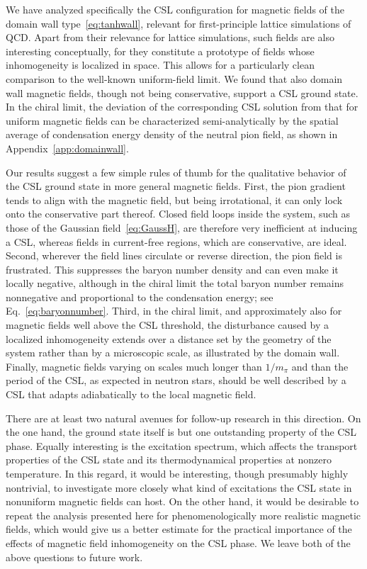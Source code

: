 \documentclass[pdflatex,iicol,sn-mathphys-num]{sn-jnl}
\begin{document}
We have analyzed specifically the CSL configuration for magnetic fields of the domain wall type~\eqref{eq:tanhwall}, relevant for first-principle lattice simulations of QCD. Apart from their relevance for lattice simulations, such fields are also interesting conceptually, for they constitute a prototype of fields whose inhomogeneity is localized in space. This allows for a particularly clean comparison to the well-known uniform-field limit. We found that also domain wall magnetic fields, though not being conservative, support a CSL ground state. In the chiral limit, the deviation of the corresponding CSL solution from that for uniform magnetic fields can be characterized semi-analytically by the spatial average of condensation energy density of the neutral pion field, as shown in Appendix~\ref{app:domainwall}.

Our results suggest a few simple rules of thumb for the qualitative behavior of the CSL ground state in more general magnetic fields. First, the pion gradient tends to align with the magnetic field, but being irrotational, it can only lock onto the conservative part thereof. Closed field loops inside the system, such as those of the Gaussian field~\eqref{eq:GaussH}, are therefore very inefficient at inducing a CSL, whereas fields in current-free regions, which are conservative, are ideal. Second, wherever the field lines circulate or reverse direction, the pion field is frustrated. This suppresses the baryon number density and can even make it locally negative, although in the chiral limit the total baryon number remains nonnegative and proportional to the condensation energy; see Eq.~\eqref{eq:baryonnumber}. Third, in the chiral limit, and approximately also for magnetic fields well above the CSL threshold, the disturbance caused by a localized inhomogeneity extends over a distance set by the geometry of the system rather than by a microscopic scale, as illustrated by the domain wall. Finally, magnetic fields varying on scales much longer than $1/m_\pi$ and than the period of the CSL, as expected in neutron stars, should be well described by a CSL that adapts adiabatically to the local magnetic field.

There are at least two natural avenues for follow-up research in this direction. On the one hand, the ground state itself is but one outstanding property of the CSL phase. Equally interesting is the excitation spectrum, which affects the transport properties of the CSL state and its thermodynamical properties at nonzero temperature. In this regard, it would be interesting, though presumably highly nontrivial, to investigate more closely what kind of excitations the CSL state in nonuniform magnetic fields can host. On the other hand, it would be desirable to repeat the analysis presented here for phenomenologically more realistic magnetic fields, which would give us a better estimate for the practical importance of the effects of magnetic field inhomogeneity on the CSL phase. We leave both of the above questions to future work.
\end{document}
